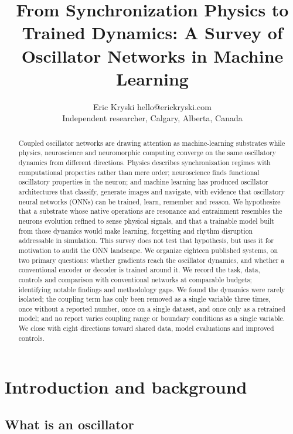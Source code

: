\documentclass[10pt]{article}
\title{From Synchronization Physics to Trained Dynamics: A Survey of
Oscillator Networks in Machine Learning}
\author{\name Eric Kryski \email hello@erickryski.com \\
      \addr Independent researcher, Calgary, Alberta, Canada}
\date{}
\begin{document}
\maketitle
\begin{abstract}
Coupled oscillator networks are drawing attention as machine-learning
substrates while physics, neuroscience and neuromorphic computing
converge on the same oscillatory dynamics from different directions.
Physics describes synchronization regimes with computational properties
rather than mere order; neuroscience finds functional oscillatory
properties in the neuron; and machine learning has produced oscillator
architectures that classify, generate images and navigate, with evidence
that oscillatory neural networks (ONNs) can be trained, learn, remember
and reason. We hypothesize that a substrate whose native operations are
resonance and entrainment resembles the neurons evolution refined to
sense physical signals, and that a trainable model built from those
dynamics would make learning, forgetting and rhythm disruption
addressable in simulation. This survey does not test that hypothesis,
but uses it for motivation to audit the ONN landscape. We organize
eighteen published systems, on two primary questions: whether gradients
reach the oscillator dynamics, and whether a conventional encoder or
decoder is trained around it. We record the task, data, controls and
comparison with conventional networks at comparable budgets; identifying
notable findings and methodology gaps. We found the dynamics were rarely
isolated; the coupling term has only been removed as a single variable
three times, once without a reported number, once on a single dataset,
and once only as a retrained model; and no report varies coupling range
or boundary conditions as a single variable. We close with eight
directions toward shared data, model evaluations and improved controls.
\end{abstract}

\section{Introduction and background}\label{sec-1}

\subsection{What is an oscillator}\label{sec-1-1}
\end{document}
